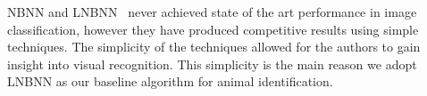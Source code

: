         NBNN and LNBNN~\cite{boiman_defense_2008,mccann_local_2012}
          never achieved state of the art performance in image
          classification, however they have produced competitive results
          using simple techniques.
        The simplicity of the techniques allowed for the authors to
          gain insight into visual recognition.
        This simplicity is the main reason we adopt LNBNN as our
          baseline algorithm for animal identification.

